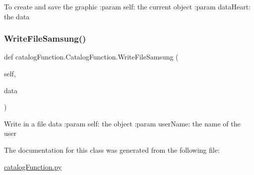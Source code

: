 \begin{DoxyVerb}    To create and save the graphic
    :param self: the current object
    :param dataHeart: the data
\end{DoxyVerb}
 \mbox{\label{classcatalog_function_1_1_catalog_function_a1c9af8a49037e222e32418d430f91d2d}} 
\subsubsection{\texorpdfstring{Write\+File\+Samsung()}{WriteFileSamsung()}}
{\footnotesize\ttfamily def catalog\+Function.\+Catalog\+Function.\+Write\+File\+Samsung (\begin{DoxyParamCaption}\item[{}]{self,  }\item[{}]{data }\end{DoxyParamCaption})}

\begin{DoxyVerb}    Write in a file data 
    :param self: the object
    :param userName: the name of the user
\end{DoxyVerb}
 

The documentation for this class was generated from the following file\+:\begin{DoxyCompactItemize}
\item 
\hyperlink{catalog_function_8py}{catalog\+Function.\+py}\end{DoxyCompactItemize}
